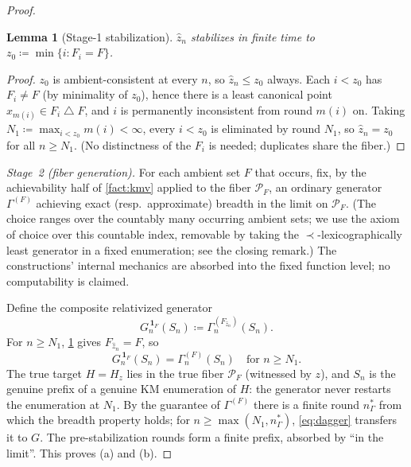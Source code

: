 \documentclass[11pt]{article}
\numberwithin{equation}{section}
\newcommand{\mc}[1]{\mathcal{#1}}
\newcommand{\defeq}{\coloneqq}
\newcommand{\Amb}{F}
\newcommand{\Val}{H}
\newcommand{\Pairs}{\mc{P}}
\newcommand{\Seen}{S}
\newcommand{\fiber}[1]{\Pairs_{#1}}
\theoremstyle{plain}
\newtheorem{lemma}[theorem]{Lemma}
\theoremstyle{definition}
\theoremstyle{remark}
\begin{document}
\begin{proof}
\begin{lemma}[Stage-1 stabilization]\label{lem:s1}
$\hat z_n$ stabilizes in finite time to $z_0 \defeq \min\{ i : \Amb_i = \Amb \}$.
\end{lemma}

\begin{proof}
$z_0$ is ambient-consistent at every $n$, so $\hat z_n \le z_0$ always. Each $i < z_0$ has
$\Amb_i \ne \Amb$ (by minimality of $z_0$), hence there is a least canonical point $x_{m(i)}
\in \Amb_i \mathbin\triangle \Amb$, and $i$ is permanently inconsistent from round $m(i)$ on.
Taking $N_1 \defeq \max_{i < z_0} m(i) < \infty$, every $i < z_0$ is eliminated by round
$N_1$, so $\hat z_n = z_0$ for all $n \ge N_1$. (No distinctness of the $\Amb_i$ is needed;
duplicates share the fiber.)
\end{proof}

\emph{Stage~2 (fiber generation).} For each ambient set $\Amb$ that occurs, fix, by the
achievability half of \cref{fact:kmv} applied to the fiber $\fiber{\Amb}$, an ordinary
generator $\Gamma^{(\Amb)}$ achieving exact (resp.\ approximate) breadth in the limit on
$\fiber{\Amb}$. (The choice ranges over the countably many occurring ambient sets; we use the
axiom of choice over this countable index, removable by taking the $\prec$-lexicographically
least generator in a fixed enumeration; see the closing remark.) The constructions' internal
mechanics are absorbed into the fixed function level; no computability is claimed.

Define the composite relativized generator
\begin{equation}\label{eq:composite}
  G_n^{\,\mathbf 1_{\Amb}}(\Seen_n) \defeq \Gamma^{(\Amb_{\hat z_n})}_n(\Seen_n).
\end{equation}
For $n \ge N_1$, \cref{lem:s1} gives $\Amb_{\hat z_n} = \Amb$, so
\begin{equation}\label{eq:dagger}
  G_n^{\,\mathbf 1_{\Amb}}(\Seen_n) = \Gamma^{(\Amb)}_n(\Seen_n)
  \quad\text{for } n \ge N_1. \tag{$\dagger$}
\end{equation}
The true target $\Val = \Val_z$ lies in the true fiber $\fiber{\Amb}$ (witnessed by $z$), and
$\Seen_n$ is the genuine prefix of a genuine KM enumeration of $\Val$: the generator never
restarts the enumeration at $N_1$. By the guarantee of $\Gamma^{(\Amb)}$ there is a finite
round $n^*_\Gamma$ from which the breadth property holds; for $n \ge \max(N_1, n^*_\Gamma)$,
\eqref{eq:dagger} transfers it to $G$. The pre-stabilization rounds form a finite prefix,
absorbed by ``in the limit''. This proves (a) and (b).


\end{proof}
\end{document}
